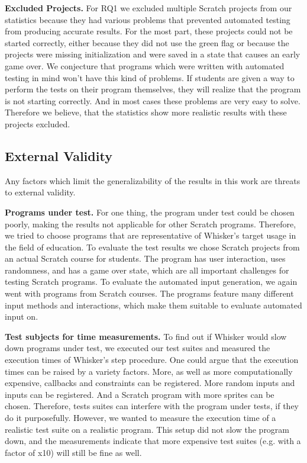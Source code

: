 \textbf{Excluded Projects.}
For RQ1 we excluded multiple Scratch projects from our statistics because they had various problems that
prevented automated testing from producing accurate results.
For the most part, these projects could not be started correctly,
either because they did not use the green flag or because the projects were missing initialization and were
saved in a state that causes an early game over.
We conjecture that programs which were written with automated testing in mind won't have this kind of problems.
If students are given a way to perform the tests on their program themselves, they will realize that the program is not starting correctly.
And in most cases these problems are very easy to solve.
Therefore we believe, that the statistics show more realistic results with these projects excluded.

\subsection{External Validity}

Any factors which limit the generalizability of the results in this work are threats to external validity.
\parspace

\textbf{Programs under test.} For one thing, the program under test could be chosen poorly,
making the results not applicable for other Scratch programs.
Therefore, we tried to choose programs that are representative of Whisker's target usage in the field of education.
To evaluate the test results we chose Scratch projects from an actual Scratch course for students.
The program has user interaction, uses randomness, and has a game over state,
which are all important challenges for testing Scratch programs.
To evaluate the automated input generation,
we again went with programs from Scratch courses.
The programs feature many different input methods and interactions,
which make them suitable to evaluate automated input on.
\parspace

\textbf{Test subjects for time measurements.}
To find out if Whisker would slow down programs under test,
we executed our test suites and measured the execution times of Whisker's step procedure.
One could argue that the execution times can be raised by a variety factors.
More, as well as more computationally expensive, callbacks and constraints can be registered.
More random inputs and inputs can be registered.
And a Scratch program with more sprites can be chosen.
Therefore, tests suites can interfere with the program under tests, if they do it purposefully.
However, we wanted to measure the execution time of a realistic test suite on a realistic program.
This setup did not slow the program down,
and the measurements indicate that more expensive test suites (e.g. with a factor of x10) will still be fine as well.
%
